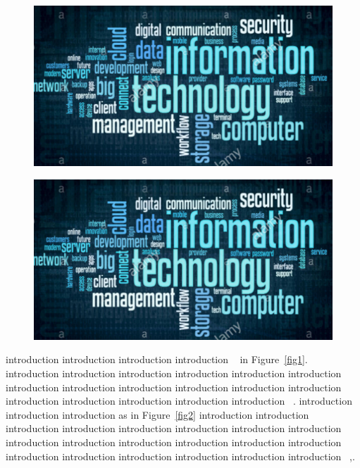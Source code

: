 \begin{figure}[ht]
\centering
\begin{minipage}{.5\textwidth}
  \centering
  \includegraphics[width=.9\linewidth]{figures/samples/it.png}
  \label{fig:test1}
\end{minipage}%
\begin{minipage}{.5\textwidth}
  \centering
  \includegraphics[width=.9\linewidth]{figures/samples/it.png}
  \label{fig:test2}
\end{minipage}
\end{figure}


 introduction introduction introduction introduction ~\cite{ref1} in Figure~\ref{fig1}. introduction introduction introduction introduction introduction introduction introduction introduction introduction introduction introduction introduction introduction introduction introduction introduction introduction ~\cite{ref2}. introduction introduction introduction as in Figure~\ref{fig2} introduction introduction introduction introduction introduction introduction introduction introduction introduction introduction introduction introduction introduction introduction introduction introduction introduction introduction introduction introduction 
~\cite{ref3},\cite{ref4}. 



